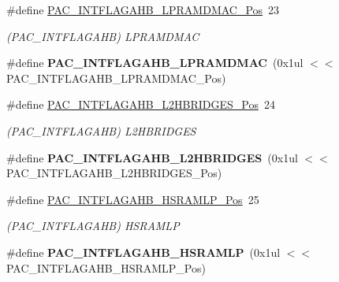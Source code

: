 \begin{DoxyCompactItemize}
\item 
\hypertarget{group___s_a_m_l21___p_a_c_ga6653b802879362b67b49226e747901e3}{}\#define \hyperlink{group___s_a_m_l21___p_a_c_ga6653b802879362b67b49226e747901e3}{P\+A\+C\+\_\+\+I\+N\+T\+F\+L\+A\+G\+A\+H\+B\+\_\+\+L\+P\+R\+A\+M\+D\+M\+A\+C\+\_\+\+Pos}~23\label{group___s_a_m_l21___p_a_c_ga6653b802879362b67b49226e747901e3}

\begin{DoxyCompactList}\small\item\em (P\+A\+C\+\_\+\+I\+N\+T\+F\+L\+A\+G\+A\+H\+B) L\+P\+R\+A\+M\+D\+M\+A\+C \end{DoxyCompactList}\item 
\hypertarget{group___s_a_m_l21___p_a_c_ga38383e5f926f78de00e53053d21b1703}{}\#define {\bfseries P\+A\+C\+\_\+\+I\+N\+T\+F\+L\+A\+G\+A\+H\+B\+\_\+\+L\+P\+R\+A\+M\+D\+M\+A\+C}~(0x1ul $<$$<$ P\+A\+C\+\_\+\+I\+N\+T\+F\+L\+A\+G\+A\+H\+B\+\_\+\+L\+P\+R\+A\+M\+D\+M\+A\+C\+\_\+\+Pos)\label{group___s_a_m_l21___p_a_c_ga38383e5f926f78de00e53053d21b1703}

\item 
\hypertarget{group___s_a_m_l21___p_a_c_gaff72724ea67fbc48704a4767b3f58579}{}\#define \hyperlink{group___s_a_m_l21___p_a_c_gaff72724ea67fbc48704a4767b3f58579}{P\+A\+C\+\_\+\+I\+N\+T\+F\+L\+A\+G\+A\+H\+B\+\_\+\+L2\+H\+B\+R\+I\+D\+G\+E\+S\+\_\+\+Pos}~24\label{group___s_a_m_l21___p_a_c_gaff72724ea67fbc48704a4767b3f58579}

\begin{DoxyCompactList}\small\item\em (P\+A\+C\+\_\+\+I\+N\+T\+F\+L\+A\+G\+A\+H\+B) L2\+H\+B\+R\+I\+D\+G\+E\+S \end{DoxyCompactList}\item 
\hypertarget{group___s_a_m_l21___p_a_c_ga5c048492650d4af4a70e89af6fb9eead}{}\#define {\bfseries P\+A\+C\+\_\+\+I\+N\+T\+F\+L\+A\+G\+A\+H\+B\+\_\+\+L2\+H\+B\+R\+I\+D\+G\+E\+S}~(0x1ul $<$$<$ P\+A\+C\+\_\+\+I\+N\+T\+F\+L\+A\+G\+A\+H\+B\+\_\+\+L2\+H\+B\+R\+I\+D\+G\+E\+S\+\_\+\+Pos)\label{group___s_a_m_l21___p_a_c_ga5c048492650d4af4a70e89af6fb9eead}

\item 
\hypertarget{group___s_a_m_l21___p_a_c_ga5d27d7d264dd8d0804d565c295871c8a}{}\#define \hyperlink{group___s_a_m_l21___p_a_c_ga5d27d7d264dd8d0804d565c295871c8a}{P\+A\+C\+\_\+\+I\+N\+T\+F\+L\+A\+G\+A\+H\+B\+\_\+\+H\+S\+R\+A\+M\+L\+P\+\_\+\+Pos}~25\label{group___s_a_m_l21___p_a_c_ga5d27d7d264dd8d0804d565c295871c8a}

\begin{DoxyCompactList}\small\item\em (P\+A\+C\+\_\+\+I\+N\+T\+F\+L\+A\+G\+A\+H\+B) H\+S\+R\+A\+M\+L\+P \end{DoxyCompactList}\item 
\hypertarget{group___s_a_m_l21___p_a_c_ga8bb7d0b0058083976334f932bb383614}{}\#define {\bfseries P\+A\+C\+\_\+\+I\+N\+T\+F\+L\+A\+G\+A\+H\+B\+\_\+\+H\+S\+R\+A\+M\+L\+P}~(0x1ul $<$$<$ P\+A\+C\+\_\+\+I\+N\+T\+F\+L\+A\+G\+A\+H\+B\+\_\+\+H\+S\+R\+A\+M\+L\+P\+\_\+\+Pos)\label{group___s_a_m_l21___p_a_c_ga8bb7d0b0058083976334f932bb383614}


\end{DoxyCompactItemize}
